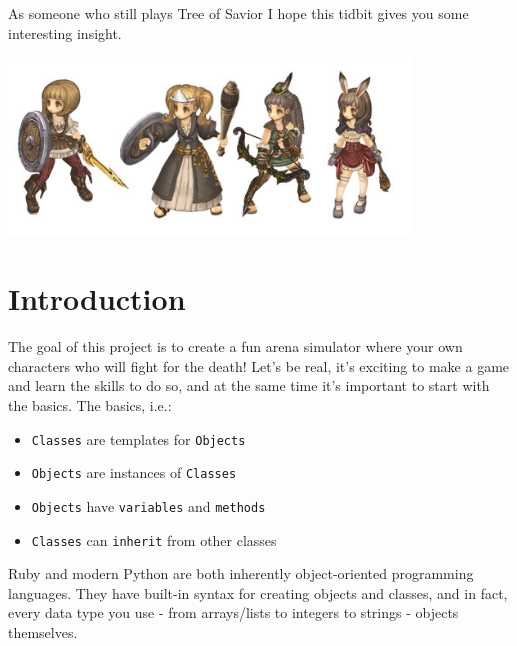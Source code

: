 \documentclass{42-en}
\begin{document}
	As someone who still plays Tree of Savior I hope this tidbit gives you some
	interesting insight.

	\begin{center}
		\includegraphics[width=0.8\textwidth]{images/classes.jpg}
	\end{center}

\chapter{Introduction}

	The goal of this project is to create a fun arena simulator where
	your own characters who will fight for the death! Let's be real,
	it's exciting to make a game and learn the skills to do so, and at the same
	time it's important to start with the basics. The basics, i.e.:
	\begin{itemize}
		\item \texttt{Classes} are templates for \texttt{Objects}
		\item \texttt{Objects} are instances of \texttt{Classes}
		\item \texttt{Objects} have \texttt{variables} and \texttt{methods}
		\item \texttt{Classes} can \texttt{inherit} from other classes
	\end{itemize}

	Ruby and modern Python are both inherently object-oriented programming
	languages. They have built-in syntax for creating objects and classes, and
	in fact, every data type you use - from arrays/lists to integers to strings -
	objects themselves.\\
\end{document}
